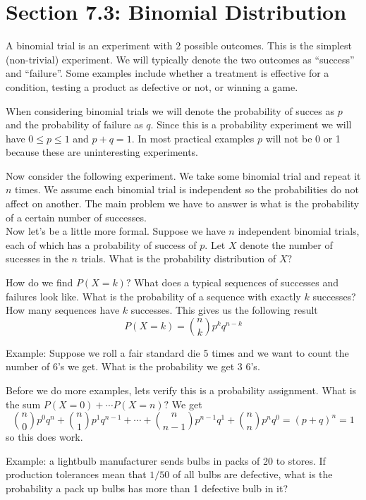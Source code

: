 \documentclass[14,fleqn]{article}
\begin{document}
\section{Section 7.3: Binomial Distribution}

A binomial trial is an experiment with 2 possible outcomes. This is the simplest (non-trivial) experiment. We will typically denote the two outcomes as ``success'' and ``failure''. Some examples include whether a treatment is effective for a condition, testing a product as defective or not, or winning a game.

When considering binomial trials we will denote the probability of succes as $p$ and the probability of failure as $q.$ Since this is a probability experiment we will have $0\le p\le 1$ and $p+q=1.$ In most practical examples $p$ will not be 0 or 1 because these are uninteresting experiments.

Now consider the following experiment. We take some binomial trial and repeat it $n$ times. We assume each binomial trial is independent so the probabilities do not affect on another. The main problem we have to answer is what is the probability of a certain number of successes.\\

Now let's be a little more formal. Suppose we have $n$ independent binomial trials, each of which has a probability of success of $p.$ Let $X$ denote the number of sucesses in the $n$ trials. What is the probability distribution of $X?$

How do we find $P(X=k)?$ What does a typical sequences of successes and failures look like. What is the probability of a sequence with exactly $k$ successes? How many sequences have $k$ successes. This gives us the following result
\[
	P(X=k)=\binom{n}{k}p^kq^{n-k}
\]

Example: Suppose we roll a fair standard die 5 times and we want to count the number of 6's we get. What is the probability we get 3 6's. 

Before we do more examples, lets verify this is a probability assignment.
What is the sum $P(X=0)+\cdots P(X=n)?$ We get
\[
	\binom{n}{0}p^0q^n+\binom{n}{1}p^1q^{n-1}+\cdots +\binom{n}{n-1}p^{n-1}q^1+\binom{n}{n}p^nq^0=(p+q)^n=1
\]
so this does work.

Example: a lightbulb manufacturer sends bulbs in packs of 20 to stores. If production tolerances mean that $1/50$ of all bulbs are defective, what is the probability a pack up bulbs has more than 1 defective bulb in it?
\end{document}
